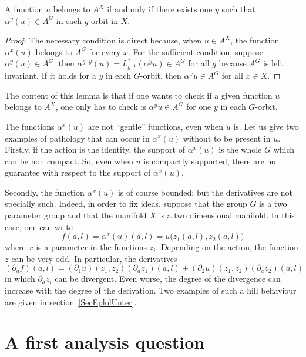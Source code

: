 \begin{lemma}
	A function $u$ belongs to $A^{X}$ if and only if there exists one $y$ such that $\alpha^y(u)\in A^G$ in each $g$-orbit in $X$.
	\label{LemUnPtParOrbite}
\end{lemma}

\begin{proof}
	The necessary condition is direct because, when $u\in A^X$, the function $\alpha^x(u)$ belongs to $A^G$ for every $x$. For the sufficient condition, suppose $\alpha^y(u)\in A^{G}$, then $\alpha^{g\cdot y}(u)=L_{g^{-1}}^*(\alpha^yu)\in A^{G}$ for all $g$ because $A^{G}$ is left invariant. If it holds for a $y$ in each $G$-orbit, then $\alpha^xu\in A^{G}$ for all $x\in X$.
\end{proof}

The content of this lemma is that if one wants to check if a given function $u$ belongs to $A^{X}$, one only has to check is $\alpha^yu\in A^{G}$ for one $y$ in each $G$-orbit.


The functions $\alpha^x(u)$ are not ``gentle'' functions, even when $u$ is. Let us give two examples of pathology that can occur in $\alpha^x(u)$ without to be present in $u$. Firstly,  if the action is the identity, the support of $\alpha^x(u)$ is the whole $G$ which can be non compact. So, even when $u$ is compactly supported, there are no guarantee with respect to the support of $\alpha^x(u)$.

Secondly, the function $\alpha^x(u)$ is of course bounded; but the derivatives are not specially such. Indeed, in order to fix ideas, suppose that the group $G$ is a two parameter group and that the manifold $X$ is a two dimensional manifold. In this case, one can write
\begin{equation}        \label{EqDefziDefA}
	f(a,l)=\alpha^x(u)(a,l)=u\big( z_1(a,l),z_2(a,l) \big)
\end{equation}
where $x$ is a parameter in the functions $z_i$. Depending on the action, the function $z$ can be very odd. In particular, the derivatives
\[
	(\partial_af)(a,l)=(\partial_1u)(z_1,z_2)(\partial_az_1)(a,l)+(\partial_2u)(z_1,z_2)(\partial_az_2)(a,l)
\]
in which $\partial_az_i$ can be divergent. Even worse, the degree of the divergence can increase with the degree of the derivation. Two examples of such a hill behaviour are given in section~\ref{SecEplolUnter}.


\section{A first analysis question}

